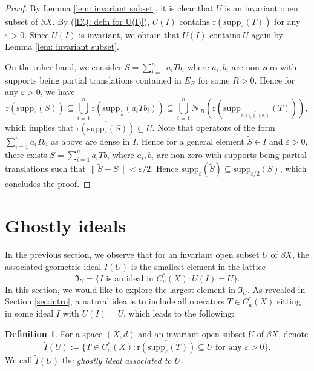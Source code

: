 \documentclass[12pt, a4paper]{amsart}
\numberwithin{equation}{section}
\theoremstyle{definition}
\newtheorem{defn}[thm]{Definition}
\theoremstyle{remark}
\def\Nd{\mathcal{N}}
\def\supp{\mathrm{supp}}
\def\r{\mathrm{r}}
\begin{document}
\begin{proof}
By Lemma \ref{lem: invariant subset}, it is clear that $U$ is an invariant open subset of $\beta X$. By (\ref{EQ: defn for U(I)}), $U(I)$ contains $\overline{\r(\supp_\varepsilon(T))}$ for any $\varepsilon>0$. Since $U(I)$ is invariant, we obtain that $U(I)$ contains $U$ again by Lemma \ref{lem: invariant subset}.

On the other hand, we consider $S=\sum_{i=1}^n a_iTb_i$ where $a_i, b_i$ are non-zero with supports being partial translations contained in $E_R$ for some $R>0$. Hence for any $\varepsilon>0$, we have
\[
\r\left(\supp_\varepsilon(S)\right) \subseteq \bigcup_{i=1}^n \r\left(\supp_{\frac{\varepsilon}{n}}(a_iTb_i)\right) \subseteq \bigcup_{i=1}^n \Nd_R\left(\r\left(\supp_{\frac{\varepsilon}{n\|a_i\|\cdot\|b_i\|}}(T)\right)\right),
\]
which implies that $\overline{\r\left(\supp_\varepsilon(S)\right)} \subseteq U$. Note that operators of the form $\sum_{i=1}^n a_iTb_i$ as above are dense in $I$. Hence for a general element $\tilde{S} \in I$ and $\varepsilon>0$, there exists $S=\sum_{i=1}^n a_iTb_i$ where $a_i, b_i$ are non-zero with supports being partial translations such that $\|\tilde{S} - S\| < \varepsilon/2$. Hence $\supp_{\varepsilon}(\tilde{S}) \subseteq \supp_{\varepsilon/2}(S)$, which concludes the proof.
\end{proof}



\section{Ghostly ideals}\label{sec:ghostly ideals}

In the previous section, we observe that for an invariant open subset $U$ of $\beta X$, the associated geometric ideal $I(U)$ is the smallest element in the lattice
\[
\mathfrak{I}_U=\{I \mbox{~is~an~ideal~in~} C^*_u(X): U(I)=U\}.
\]
In this section, we would like to explore the largest element in $\mathfrak{I}_U$. As revealed in Section \ref{sec:intro}, a natural idea is to include all operators $T \in C^*_u(X)$ sitting in some ideal $I$ with $U(I)=U$, which leads to the following:

\begin{defn}\label{defn: ghostly ideals}
For a space $(X,d)$ and an invariant open subset $U$ of $\beta X$, denote
\[
\tilde{I}(U):=\{T \in C^*_u(X): \overline{\r(\supp_\varepsilon(T))} \subseteq U \mbox{~for~any~}\varepsilon>0\}.
\]
We call $\tilde{I}(U)$ the \emph{ghostly ideal associated to $U$}.
\end{defn}
\end{document}
